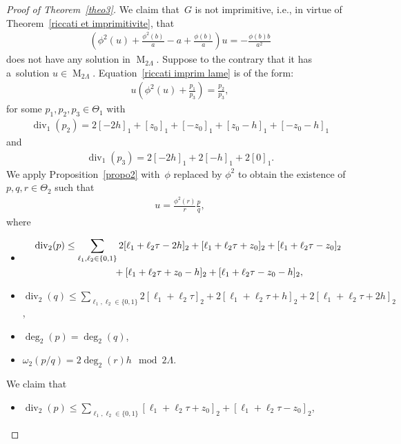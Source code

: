 \documentclass[10pt,a4paper]{amsart}
\numberwithin{equation}{section}
\newcommand{\divi}[1]{\operatorname{div}_{#1}}
\newcommand{\weight}[1]{\omega_{#1}}
\newcommand{\degr}[1]{\deg_{#1}}
\newcommand{\prodtheta}[1]{\Theta_{#1}}
\begin{document}
\begin{proof}[Proof of Theorem~\ref{theo3}]
We claim that~$G$ is not imprimitive, i.e., in virtue of Theorem~\ref{riccati et imprimitivite}, that
\begin{gather}
\label{riccati imprim lame}
\left(\phi^{2}(u)+\frac{\phi^{2}(b)}{a}-a+\frac{\phi(b)}{a} \right)u=-\frac{\phi(b)b}{a^{2}}
\end{gather}
does not have any solution in $\operatorname{M}_{2\Lambda}$.
Suppose to the contrary that it has a~solution $u \in \operatorname{M}_{2\Lambda}$.
Equation~\eqref{riccati imprim lame} is of the form:
\begin{gather*}
u\left(\phi^{2}(u)+\frac{p_{1}}{p_{3}}\right)=\frac{p_{2}}{p_{3}},
\end{gather*}
for some $p_{1},p_{2},p_{3}\in \prodtheta{1}$ with
\begin{gather*}
\divi{1} (p_{2})=2[-2h]_{1}+[z_{0}]_{1}+[-z_{0}]_{1}+[z_{0}-h]_{1}+[-z_{0}-h]_{1}
\end{gather*}
and
\begin{gather*}
\divi{1} (p_{3})=2[-2h]_{1}+2[-h]_{1}+2[0]_{1}.
\end{gather*}
We apply Proposition~\ref{propo2} with~$\phi$ replaced by $\phi^2$ to obtain the existence of $p,q,r\in \prodtheta{2}$
such that
\begin{gather*}
u= \frac{\phi^{2}(r)}{r}\frac{p}{q},
\end{gather*}
where
\begin{itemize}\itemsep=0pt
\item[(v)]
\begin{gather*}
 \divi{2} (p)  \leq \sum\limits_{\ell_{1},\ell_{2} \in
\{0,1\}} 2[\ell_{1}+\ell_{2}\tau-2h]_{2}+[\ell_{1}+\ell_{2}\tau+z_{0}]_{2}+[\ell_{1}+\ell_{2}\tau-z_{0}]_{2}
\\
\hphantom{\divi{2} (p)  \leq}{} +[\ell_{1}+\ell_{2}\tau+z_{0}-h]_{2}+[\ell_{1}+\ell_{2}\tau-z_{0}-h]_{2},
\end{gather*}
\item[(vi)] $\divi{2} (q) \leq \sum\limits_{\ell_{1},\ell_{2} \in
\{0,1\}}2[\ell_{1}+\ell_{2}\tau]_{2}+2[\ell_{1}+\ell_{2}\tau+h]_{2}+2[\ell_{1}+\ell_{2}\tau+2h]_{2}$,
\item[(vii)] $\degr{2} (p)=\degr{2} (q)$,
\item[(viii)] $\weight{2} (p/q)=2\degr{2} (r) h \mod 2\Lambda$.
\end{itemize}
We claim that
\begin{itemize}
\itemsep=0pt
\item[(v$'$)] $\divi{2} (p) \leq \sum\limits_{\ell_{1},\ell_{2} \in
\{0,1\}}[\ell_{1}+\ell_{2}\tau+z_{0}]_{2}+[\ell_{1}+\ell_{2}\tau-z_{0}]_{2}$,

\end{itemize}
\end{proof}
\end{document}
